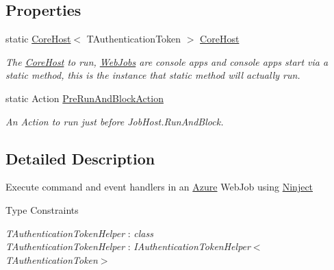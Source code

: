 \subsection*{Properties}
\begin{DoxyCompactItemize}
\item 
static \hyperlink{classCqrs_1_1Hosts_1_1CoreHost}{Core\+Host}$<$ T\+Authentication\+Token $>$ \hyperlink{classCqrs_1_1Ninject_1_1Azure_1_1WebJobs_1_1CqrsNinjectJobHost_a2c166839548b7c238a9462b46bd8e555_a2c166839548b7c238a9462b46bd8e555}{Core\+Host}
\begin{DoxyCompactList}\small\item\em The \hyperlink{classCqrs_1_1Ninject_1_1Azure_1_1WebJobs_1_1CqrsNinjectJobHost_a2c166839548b7c238a9462b46bd8e555_a2c166839548b7c238a9462b46bd8e555}{Core\+Host} to run, \hyperlink{namespaceCqrs_1_1Ninject_1_1Azure_1_1WebJobs}{Web\+Jobs} are console apps and console apps start via a static method, this is the instance that static method will actually run. \end{DoxyCompactList}\item 
static Action \hyperlink{classCqrs_1_1Ninject_1_1Azure_1_1WebJobs_1_1CqrsNinjectJobHost_a16eceaa51739d5baff6e4986ed822d8f_a16eceaa51739d5baff6e4986ed822d8f}{Pre\+Run\+And\+Block\+Action}
\begin{DoxyCompactList}\small\item\em An Action to run just before Job\+Host.\+Run\+And\+Block. \end{DoxyCompactList}\end{DoxyCompactItemize}


\subsection{Detailed Description}
Execute command and event handlers in an \hyperlink{namespaceCqrs_1_1Ninject_1_1Azure}{Azure} Web\+Job using \hyperlink{namespaceCqrs_1_1Ninject}{Ninject} 

\begin{Desc}
\item[Type Constraints]\begin{description}
\item[{\em T\+Authentication\+Token\+Helper} : {\em class}]\item[{\em T\+Authentication\+Token\+Helper} : {\em I\+Authentication\+Token\+Helper$<$T\+Authentication\+Token$>$}]\end{description}
\end{Desc}


